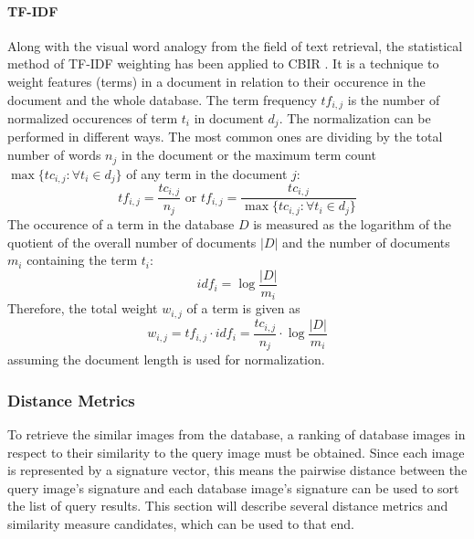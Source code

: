 \paragraph{TF-IDF}

Along with the visual word analogy from the field of text retrieval, the
statistical method of TF-IDF weighting \autocite{baeza-yates_modern_1999} has
been applied to CBIR \autocite{sivic_video_2003}. It is a technique to weight
features (terms) in a document in relation to their occurence in the document
and the whole database. The term frequency $tf_{i, j}$ is the number of
normalized occurences of term $t_i$ in document $d_j$. The normalization can be
performed in different ways. The most common ones are dividing by the total
number of words $n_j$ in the document or the maximum term count $\max \{ tc_{i,
j} : \forall t_i \in d_j \}$ of any term in the document $j$:
\begin{equation*}
    tf_{i, j} = \frac{tc_{i, j}}{n_j} \text{ or } tf_{i, j} = \frac{tc_{i, j}}{\max \{ tc_{i, j} : \forall t_i \in d_j \}}
\end{equation*}
The occurence of a term in the database $D$ is measured as the logarithm of the
quotient of the overall number of documents $|D|$ and the number of documents
$m_i$ containing the term $t_i$:
\begin{equation*}
    idf_{i} = \log \frac{|D|}{m_i}
\end{equation*}
Therefore, the total weight $w_{i, j}$ of a term is given as
\begin{equation*}
    w_{i, j} = tf_{i, j} \cdot idf_{i} = \frac{tc_{i, j}}{n_j} \cdot \log \frac{|D|}{m_i}
\end{equation*}
assuming the document length is used for normalization.

\subsubsection{Distance Metrics}\label{sec:anatomy_ranking_distance}

To retrieve the similar images from the database, a ranking of database images
in respect to their similarity to the query image must be obtained. Since each
image is represented by a signature vector, this means the pairwise distance
between the query image's signature and each database image's signature can be
used to sort the list of query results. This section will describe several
distance metrics and similarity measure candidates, which can be used to that
end.

